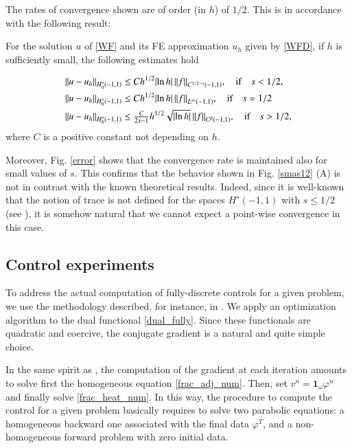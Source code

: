 The rates of convergence shown are of order (in $h$) of $1/2$. This is in accordance with the following result: 
\begin{theorem}
For the solution $u$ of \eqref{WF} and its FE approximation $u_h$ given by \eqref{WFD}, if $h$ is sufficiently small, the following estimates hold

\begin{align*}
	&{\left\|u-u_h\right\|}_{H^s_0(-1,1)}\leq C h^{1/2}|\!\ln h|\,{\left\|f\right\|}_{C^{1/2-s}(-1,1)}, \quad \textnormal{if}\quad s<1/2, 
	\\
	&{\left\|u-u_h\right\|}_{H^s_0(-1,1)}\leq C h^{1/2} |\!\ln h|\, {\left\|f\right\|}_{L^\infty(-1,1)}, \quad \textnormal{if}\quad  s=1/2 
	\\
	&{\left\|u-u_h\right\|}_{H^s_0(-1,1)}\leq \tfrac{C}{2s-1} h^{1/2} \sqrt{|\!\ln h|}\, {\left\|f\right\|}_{C^\beta(-1,1)}, \quad \textnormal{if} \quad s>1/2,
\end{align*}
where $C$ is a positive constant not depending on $h$. 
\end{theorem}

Moreover, Fig.  \ref{error} shows that the convergence rate is maintained also for small values of $s$. This confirms that the behavior shown in Fig. \ref{smas12} (A) is not in contrast with the known theoretical results. Indeed, since it is well-known that the notion of trace is not defined for the spaces $H^s(-1,1)$ with $s\leq 1/2$ (see \cite{jllions1972non,tartar2007introduction}), it is somehow natural that we cannot expect a point-wise convergence in this case.  

\subsection{Control experiments}\label{control_exp}

To address the actual computation of fully-discrete controls for a given problem, we use the methodology described, for instance, in \cite{glowinski2008exact}. We apply an optimization algorithm to the dual functional \eqref{dual_fully}. Since these functionals are quadratic and coercive, the conjugate gradient is a natural and quite simple choice.

In the same spirit as \cite{boyer2011uniform}, the computation of the gradient at each iteration amounts to solve first the homogeneous equation \eqref{frac_adj_num}. Then, set $v^n=\mathbf{1}_\omega\varphi^n$ and finally solve \eqref{frac_heat_num}. In this way, the procedure to compute the control for a given problem basically requires to solve two parabolic equations: a homogeneous backward one associated with the final data $\varphi^T$, and a non-homogeneous forward problem with zero initial data. 

